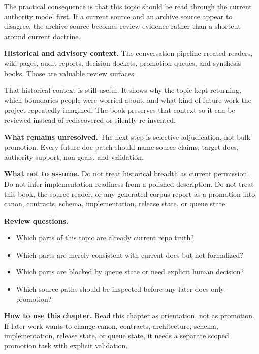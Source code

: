 \documentclass[10.5pt,a4paper,openany]{book}
\begin{document}
The practical consequence is that this topic should be read through the current authority model first.\allowbreak{} If a current source and an archive source appear to disagree, the archive source becomes review evidence rather than a shortcut around current doctrine.\allowbreak{}


\textbf{Historical and advisory context.} The conversation pipeline created readers, wiki pages, audit reports, decision dockets, promotion queues, and synthesis books.\allowbreak{} Those are valuable review surfaces.\allowbreak{}


That historical context is still useful.\allowbreak{} It shows why the topic kept returning, which boundaries people were worried about, and what kind of future work the project repeatedly imagined.\allowbreak{} The book preserves that context so it can be reviewed instead of rediscovered or silently re-\allowbreak{}invented.\allowbreak{}


\textbf{What remains unresolved.} The next step is selective adjudication, not bulk promotion.\allowbreak{} Every future doc patch should name source claims, target docs, authority support, non-\allowbreak{}goals, and validation.\allowbreak{}


\textbf{What not to assume.} Do not treat historical breadth as current permission.\allowbreak{} Do not infer implementation readiness from a polished description.\allowbreak{} Do not treat this book, the source reader, or any generated corpus report as a promotion into canon, contracts, schema, implementation, release state, or queue state.\allowbreak{}


\textbf{Review questions.}


\begin{itemize}
\item Which parts of this topic are already current repo truth?
\item Which parts are merely consistent with current docs but not formalized?
\item Which parts are blocked by queue state or need explicit human decision?
\item Which source paths should be inspected before any later docs-\allowbreak{}only promotion?
\end{itemize}

\textbf{How to use this chapter.} Read this chapter as orientation, not as promotion.\allowbreak{} If later work wants to change canon, contracts, architecture, schema, implementation, release state, or queue state, it needs a separate scoped promotion task with explicit validation.\allowbreak{}
\end{document}
